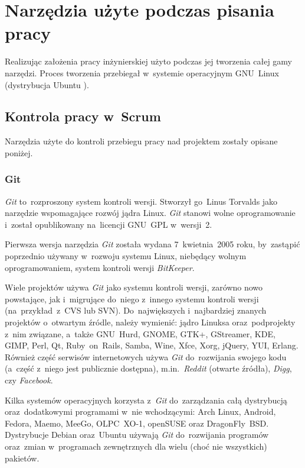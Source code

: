 \section{Narzędzia użyte podczas pisania pracy} \label{narzedzia}

Realizując założenia pracy inżynierskiej użyto podczas jej tworzenia całej gamy narzędzi. Proces tworzenia przebiegał w~systemie operacyjnym GNU~Linux \cite{kernel} (dystrybucja Ubuntu \cite{ubuntu}).

\subsection{Kontrola pracy w~Scrum}

Narzędzia użyte do kontroli przebiegu pracy nad projektem zostały opisane poniżej.

\subsubsection{Git}

\textit{Git} \cite{git} to~rozproszony system kontroli wersji. Stworzył go~Linus Torvalds jako narzędzie wspomagające rozwój jądra Linux. \textit{Git} stanowi wolne oprogramowanie i~został opublikowany na~licencji GNU~GPL w~wersji~2.

Pierwsza wersja narzędzia \textit{Git} została wydana 7~kwietnia~2005 roku, by~zastąpić poprzednio używany w~rozwoju systemu Linux, niebędący wolnym oprogramowaniem, system kontroli wersji \textit{BitKeeper}.


Wiele projektów używa \textit{Git} jako systemu kontroli wersji, zarówno nowo powstające, jak i~migrujące do~niego z~innego systemu kontroli wersji (na~przykład~z~CVS lub SVN). Do~największych i~najbardziej znanych projektów o~otwartym źródle, należy wymienić: jądro Linuksa oraz~podprojekty z~nim związane, a~także GNU~Hurd, GNOME, GTK+, GStreamer, KDE, GIMP, Perl, Qt, Ruby~on~Rails, Samba, Wine, Xfce, Xorg, jQuery, YUI, Erlang. Również część serwisów internetowych używa \textit{Git} do~rozwijania swojego kodu (a~część z~niego jest publicznie dostępna), m.in.~\textit{Reddit} (otwarte źródła), \textit{Digg}, czy \textit{Facebook}.


Kilka systemów operacyjnych korzysta z~\textit{Git} do~zarządzania całą dystrybucją oraz~dodatkowymi programami w~nie wchodzącymi: Arch Linux, Android, Fedora, Maemo, MeeGo, OLPC~XO-1, openSUSE oraz DragonFly~BSD. Dystrybucje Debian oraz~Ubuntu używają \textit{Git} do~rozwijania programów oraz~zmian w~programach zewnętrznych dla wielu (choć nie wszystkich) pakietów.

